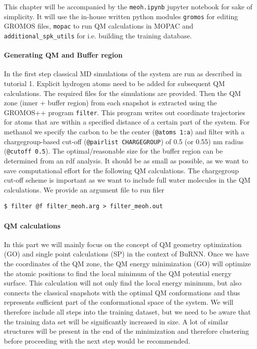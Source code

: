 This chapter will be accompanied by the \texttt{meoh.ipynb} jupyter notebook for sake of simplicity. It will use the in-house written python modules \texttt{gromos} for editing GROMOS files, \texttt{mopac} to run QM calculations in MOPAC and \texttt{additional\_spk\_utils} for i.e. building the training database.

\paragraph{Generating QM and Buffer region}
In the first step classical MD simulations of the system are run as described in tutorial 1. Explicit hydrogen atoms need to be added for subsequent QM calculations. The required files for the simulations are provided.
Then the QM zone (inner + buffer region) from each snapshot is extracted using the GROMOS++ program \texttt{filter}. This program writes out coordinate trajectories for atoms that are within a specified distance of a certain part of the system. For methanol we specify the carbon to be the center (\texttt{@atoms 1:a}) and filter with a chargegroup-based cut-off (\texttt{@pairlist CHARGEGROUP}) of 0.5 (or 0.55) nm radius (\texttt{@cutoff 0.5}). The optimal/reasonable size for the buffer region can be determined from an rdf analysis. It should be as small as possible, as we want to save computational effort for the following QM calculations. The chargegroup cut-off scheme is important as we want to include full water molecules in the QM calculations. We provide an argument file to run filer

\begin{lstlisting}[breaklines=true, breakatwhitespace=false]
$ filter @f filter_meoh.arg > filter_meoh.out
\end{lstlisting}

\paragraph{QM calculations}
In this part we will mainly focus on the concept of QM geometry optimization (GO) and single point calculations (SP) in the context of BuRNN.
Once we have the coordinates of the QM zone, the QM energy minimization (GO) will optimize the atomic positions to find the local minimum of the QM potential energy surface. This calculation will not only find the local energy minimum, but also connects the classical snapshots with the optimal QM conformations and thus represents sufficient part of the conformational space of the system. We will therefore include all steps into the training dataset, but we need to be aware that the training data set will be significantly increased in size. A lot of similar structures will be present in the end of the minimization and therefore clustering before proceeding with the next step would be recommended.


